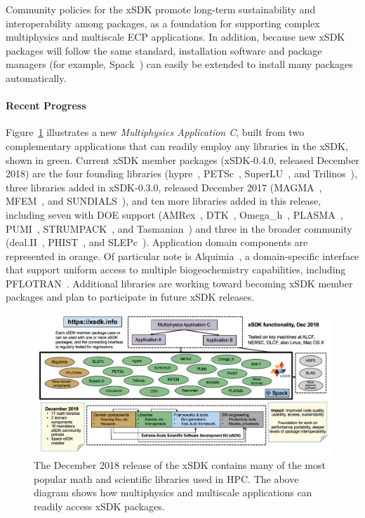 Community policies for the xSDK promote long-term sustainability and interoperability among packages, as a foundation for supporting complex multiphysics and multiscale ECP applications. In addition, because new xSDK packages will follow the same standard, installation software and package managers (for example, Spack~\cite{gamblin+:sc15}) can easily be extended to install many packages automatically.


\paragraph{Recent Progress}

Figure~\ref{fig:xsdk-schematic} illustrates a new {\em Multiphysics
	Application C}, built from two complementary applications that can
readily employ any libraries in the xSDK, shown in green.  Current xSDK member packages (xSDK-0.4.0, released December 2018) are the four founding libraries
(hypre~\cite{hypre:homepage}, PETSc~\cite{petsc:homepage}, SuperLU~\cite{superlu:homepage}, and Trilinos~\cite{trilinos:homepage}), three libraries added in xSDK-0.3.0, released December 2017 (MAGMA~\cite{magma:homepage}, MFEM~\cite{mfem:homepage}, and SUNDIALS~\cite{sundials:homepage}), and ten more libraries added in this release, including seven with DOE support (AMRex~\cite{amrex:homepage}, DTK~\cite{dtk:homepage}, Omega\_h~\cite{omega_h:homepage}, PLASMA~\cite{plasma:homepage}, PUMI~\cite{pumi:homepage}, STRUMPACK~\cite{strumpack:homepage}, and Tasmanian~\cite{tasmanian:homepage}) and three in the broader community (deal.II~\cite{deal.ii:homepage}, PHIST~\cite{phist:homepage}, and SLEPc~\cite{slepc:homepage}).  
Application domain components are represented
in orange.  Of particular note is Alquimia~\cite{alquimia:homepage}, a domain-specific interface
that support uniform access to multiple biogeochemistry capabilities, including
PFLOTRAN~\cite{pflotran:homepage}.  Additional libraries are working toward becoming xSDK member packages and plan to participate in future xSDK releases.
\begin{figure}[htb]
	\centering
	\includegraphics[width=6in]{projects/2.3.3-MathLibs/2.3.3.01-xSDK/xSDK-diagram.png}
	\caption{\label{fig:xsdk-schematic}The December 2018 release of the xSDK contains many of the most popular math and scientific libraries used in HPC.  The above diagram shows how multiphysics and multiscale applications can readily access xSDK packages.}
\end{figure}

